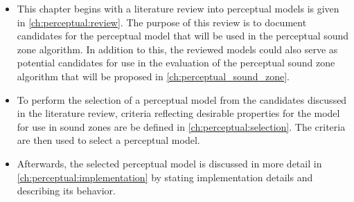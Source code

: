 \begin{itemize}
    \item This chapter begins with a literature review into perceptual models is given in \autoref{ch:perceptual:review}.
The purpose of this review is to document candidates for the perceptual model that will be used in the perceptual sound zone algorithm.
In addition to this, the reviewed models could also serve as potential candidates for use in the evaluation 
of the perceptual sound zone algorithm that will be proposed in \autoref{ch:perceptual_sound_zone}.
    \item To perform the selection of a perceptual model from the candidates discussed in the literature review, 
criteria reflecting desirable properties for the model for use in sound zones are be defined in \autoref{ch:perceptual:selection}. 
The criteria are then used to select a perceptual model.
    \item Afterwards, the selected perceptual model is discussed in more detail in \autoref{ch:perceptual:implementation} by stating implementation 
details and describing its behavior.
\end{itemize}
